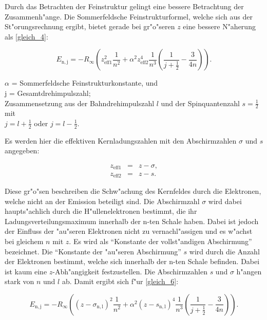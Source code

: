 		Durch das Betrachten der Feinstruktur gelingt eine bessere Betrachtung der Zu\-sam\-men\-h"an\-ge.
		Die Sommerfeldsche Feinstrukturformel, welche sich aus der St"orungsrechnung ergibt, bietet gerade bei gr"o"seren $z$ eine bessere N"aherung als \eqref{gleich_4}:

		\begin{equation}
			E_\mathrm{n,j} = -R_\infty \left(z_\mathrm{eff1}^2 \frac{1}{n^2} + \alpha^2 z_\mathrm{eff2}^4 \frac{1}{n^3} \left( \frac{1}{j + \frac{1}{2}} - \frac{3}{4n} \right) \right).\label{gleich_6}
		\end{equation}
		\begin{center}
			$\alpha$ = Sommerfeldsche Feinstrukturkonstante, und\\
			j = Gesamtdrehimpulszahl; \\
			Zusammensetzung aus der Bahndrehimpulszahl $l$ und der Spinquantenzahl $s = \frac{1}{2}$ mit\\
			$j = l + \frac{1}{2}$ oder $j = l - \frac{1}{2}$.
		\end{center}

		Es werden hier die effektiven Kernladungszahlen mit den Abschirmzahlen $\sigma$ und $s$ angegeben:

		\begin{eqnarray*}
			z_\mathrm{eff1} &=& z - \sigma,\\
			z_\mathrm{eff2} &=& z - s.
		\end{eqnarray*}

		Diese gr"o"sen beschreiben die Schw"achung des Kernfeldes durch die Elektronen, welche nicht an der Emission beteiligt sind.
		Die Abschirmzahl $\sigma$ wird dabei haupts"achlich durch die H"ul\-len\-e\-lek\-tro\-nen bestimmt, die ihr Ladungsverteilungsmaximum innerhalb der n-ten Schale haben.
		Dabei ist jedoch der Einfluss der "au"seren Elektronen nicht zu vernachl"assigen und es w"achst bei gleichem $n$ mit $z$.
		Es wird als "`Konstante der vollst"andigen Abschirmung"' bezeichnet.
		Die "`Konstante der "au"seren Abschirmung"' $s$ wird durch die Anzahl der Elektronen bestimmt, welche sich innerhalb der n-ten Schale befinden.
		Dabei ist kaum eine $z$-Ab\-h"an\-gig\-keit festzustellen.
		Die Abschirmzahlen $s$ und $\sigma$ h"angen stark von $n$ und $l$ ab.
		Damit ergibt sich f"ur \eqref{gleich_6}:

		\begin{equation}
			E_\mathrm{n,j} = -R_\infty \left( (z - \sigma_\mathrm{n,l})^2 \frac{1}{n^2} + \alpha^2 (z - s_\mathrm{n,l})^4 \frac{1}{n^3} \left( \frac{1}{j + \frac{1}{2}} - \frac{3}{4n} \right) \right). \label{gleich_7}
		\end{equation}

